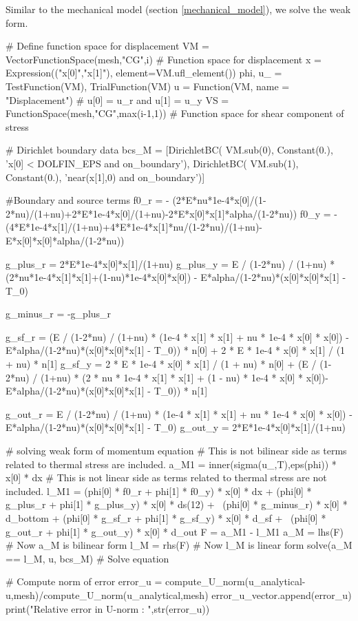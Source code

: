 Similar to the mechanical model (section \ref{mechanical_model}), we solve the weak form.
\begin{python}
# Define function space for displacement
VM = VectorFunctionSpace(mesh,"CG",i) # Function space for displacement
x = Expression(("x[0]","x[1]"), element=VM.ufl_element())
phi, u_ = TestFunction(VM), TrialFunction(VM)
u = Function(VM, name = "Displacement") # u[0] = u_r and u[1] = u_y
VS = FunctionSpace(mesh,"CG",max(i-1,1)) # Function space for shear component of stress

# Dirichlet boundary data
bcs_M = [DirichletBC( VM.sub(0), Constant(0.), 'x[0] < DOLFIN_EPS and on_boundary'), DirichletBC( VM.sub(1), Constant(0.), 'near(x[1],0) and on_boundary')] 

#Boundary and source terms
f0_r = - (2*E*nu*1e-4*x[0]/(1-2*nu)/(1+nu)+2*E*1e-4*x[0]/(1+nu)-2*E*x[0]*x[1]*alpha/(1-2*nu))
f0_y = - (4*E*1e-4*x[1]/(1+nu)+4*E*1e-4*x[1]*nu/(1-2*nu)/(1+nu)-E*x[0]*x[0]*alpha/(1-2*nu))

g_plus_r = 2*E*1e-4*x[0]*x[1]/(1+nu)
g_plus_y = E / (1-2*nu) / (1+nu) * (2*nu*1e-4*x[1]*x[1]+(1-nu)*1e-4*x[0]*x[0]) - E*alpha/(1-2*nu)*(x[0]*x[0]*x[1] - T_0)

g_minus_r = -g_plus_r

g_sf_r = (E / (1-2*nu) / (1+nu) * (1e-4 * x[1] * x[1] + nu * 1e-4 * x[0] * x[0]) - E*alpha/(1-2*nu)*(x[0]*x[0]*x[1] - T_0)) * n[0] + 2 * E * 1e-4 * x[0] * x[1] / (1 + nu) * n[1]
g_sf_y = 2 * E * 1e-4 * x[0] * x[1] / (1 + nu) * n[0] + (E / (1-2*nu) / (1+nu) * (2 * nu * 1e-4 * x[1] * x[1] + (1 - nu) * 1e-4 * x[0] * x[0])- E*alpha/(1-2*nu)*(x[0]*x[0]*x[1] - T_0)) * n[1]

g_out_r = E / (1-2*nu) / (1+nu) * (1e-4 * x[1] * x[1] + nu * 1e-4 * x[0] * x[0]) - E*alpha/(1-2*nu)*(x[0]*x[0]*x[1] - T_0)
g_out_y = 2*E*1e-4*x[0]*x[1]/(1+nu)

# solving weak form of momentum equation
# This is not bilinear side as terms related to thermal stress are included.
a_M1 = inner(sigma(u_,T),eps(phi)) * x[0] * dx
# This is not linear side as terms related to thermal stress are not included.
l_M1 = (phi[0] * f0_r + phi[1] * f0_y) * x[0] * dx + (phi[0] * g_plus_r + phi[1] * g_plus_y) * x[0] * ds(12) + \
(phi[0] * g_minus_r) * x[0] * d_bottom + (phi[0] * g_sf_r + phi[1] * g_sf_y) * x[0] * d_sf + \
(phi[0] * g_out_r + phi[1] * g_out_y) * x[0] * d_out
F = a_M1 - l_M1
a_M = lhs(F) # Now a_M is bilinear form
l_M = rhs(F) # Now l_M is linear form
solve(a_M == l_M, u, bcs_M) # Solve equation

# Compute  norm of error
error_u = compute_U_norm(u_analytical-u,mesh)/compute_U_norm(u_analytical,mesh)
error_u_vector.append(error_u)
print("Relative error in U-norm : ",str(error_u))
\end{python}

